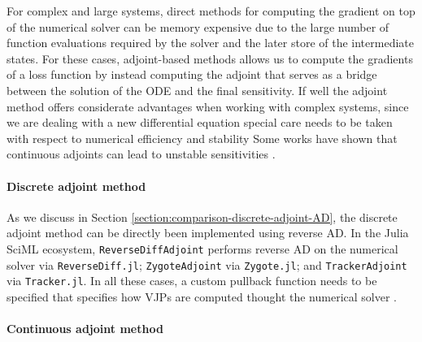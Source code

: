 
For complex and large systems, direct methods for computing the gradient on top of the numerical solver can be memory expensive due to the large number of function evaluations required by the solver and the later store of the intermediate states. 
For these cases, adjoint-based methods allows us to compute the gradients of a loss function by instead computing the adjoint that serves as a bridge between the solution of the ODE and the final sensitivity. 
If well the adjoint method offers considerate advantages when working with complex systems, since we are dealing with a new differential equation special care needs to be taken with respect to numerical efficiency and stability
Some works have shown that continuous adjoints can lead to unstable sensitivities \cite{Jensen_Nakshatrala_Tortorelli_2014}.

\paragraph{Discrete adjoint method}

As we discuss in Section \ref{section:comparison-discrete-adjoint-AD}, the discrete adjoint method can be directly been implemented using reverse AD. 
In the Julia SciML ecosystem, \texttt{ReverseDiffAdjoint} performs reverse AD on the numerical solver via \texttt{ReverseDiff.jl}; \texttt{ZygoteAdjoint} via \texttt{Zygote.jl}; and \texttt{TrackerAdjoint} via \texttt{Tracker.jl}. 
In all these cases, a custom pullback function needs to be specified that specifies how VJPs are computed thought the numerical solver \cite{rackauckas2021generalized}.

\paragraph{Continuous adjoint method}

